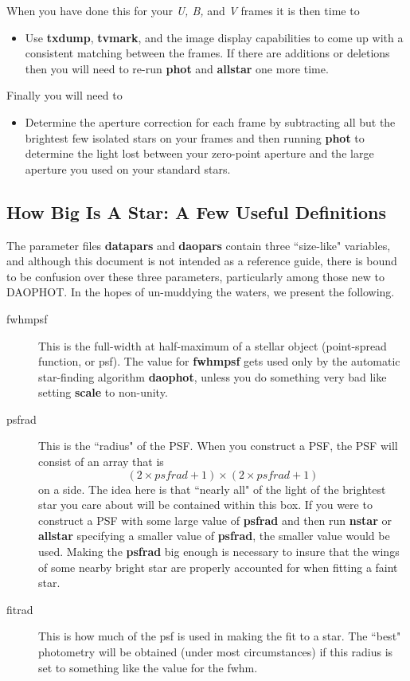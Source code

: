 When you have done this for your {\it U, B,} and {\it V} frames it is
then time to
\begin{itemize}
\item Use {\bf txdump}, {\bf tvmark}, and the image display
capabilities to come up with a consistent matching between the frames.
If there are additions or deletions then you will need to re-run
{\bf phot} and {\bf allstar} one more time.
\end{itemize} 
Finally you will need to
\begin{itemize}
\item Determine the aperture correction for each frame by subtracting
all but the brightest few isolated stars on your frames and then running
{\bf phot} to determine the light lost between your zero-point aperture
and the large aperture you used on your standard stars.
\end{itemize}
 
\subsection{How Big Is A Star: A Few Useful Definitions}

The parameter files {\bf datapars} and {\bf daopars} contain three
``size-like" variables, and although this document is not intended as
a reference guide, there is bound to be confusion over these three
parameters, particularly among those new to DAOPHOT.  In the hopes
of un-muddying the waters, we present the following.

\begin{description}
\item[fwhmpsf] This is the full-width at half-maximum of a stellar object
(point-spread function, or psf).  The value for {\bf fwhmpsf} gets used
only by the automatic star-finding algorithm {\bf daophot}, unless you
do something very bad like setting {\bf scale} to non-unity.

\item[psfrad] This is the ``radius" of the PSF.  When you construct a PSF,
the PSF will consist of an array that is
$$(2 \times psfrad +1) \times
(2 \times psfrad + 1)$$
on a side.  The idea here is that ``nearly all" of the light of the brightest
star you care about will be contained within this box.  If you were to construct
a PSF with some large value of {\bf psfrad} and then run {\bf nstar} or
{\bf allstar} 
specifying  
a smaller value of {\bf psfrad}, the smaller value would be used.  Making
the {\bf psfrad} big enough is necessary to insure that the wings of some
nearby bright star are properly accounted for when fitting a faint star.

\item[fitrad] This is how much of the psf is used in making the fit
to a star. The ``best" photometry will be obtained (under most circumstances)
if this radius is set to something like the value for the fwhm.

\end{description}

